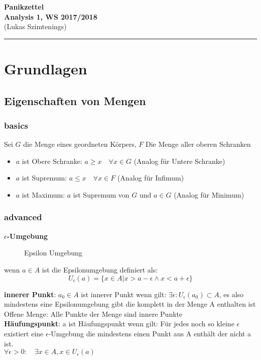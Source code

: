 \documentclass[12pt,a4paper]{article}
\begin{document}
\textbf{Panikzettel} \\ 
\textbf{Analysis 1, WS 2017/2018} \\
{\scriptsize (Lukas Szimtenings)}
\hrule 

\bigskip

\tableofcontents
\pagebreak
\section{Grundlagen}

\subsection{Eigenschaften von Mengen}

\subsubsection{basics}
Sei $G$ die Menge eines geordneten Körpers, $F$ Die Menge aller oberen Schranken
\begin{itemize}
\item $a$ ist Obere Schranke: $a\geq x\quad \forall x \in G$ (Analog für Untere Schranke)
\item $a$ ist Supremum: $a\leq x \quad \forall x \in F$ (Analog für Infimum)
\item $a$ ist Maximum: $a$ ist Supremum von $G$ und $a \in G$ (Analog für Minimum)
\end{itemize}


\subsubsection{advanced}
\textbf{$\epsilon$-Umgebung}\\
\begin{figure}[htbp]
  \centering
  
  \caption{Epsilon Umgebung}
\end{figure}
wenn $a\in A$ ist die Epsilonumgebung definiert als:\\
\[U_{\epsilon}(a)=\{ x\in A | x>a-\epsilon \wedge x<a+\epsilon\}\]

\textbf{innerer Punkt}: 
$a_0\in A$ ist innerer Punkt wenn gilt: $\exists \epsilon : U_{\epsilon}(a_0)\subset A$, es also mindestens eine Epsilonumgebung gibt die komplett in der Menge A enthalten ist\\
Offene Menge: Alle Punkte der Menge sind innere Punkte\\

\textbf{Häufungspunkt}: 
a ist Häufungspunkt wenn gilt: Für jedes noch so kleine $\epsilon$ existiert eine $\epsilon$-Umgebung die mindestens einen Punkt aus A enthält der nicht a ist.\\
$\forall \epsilon>0:\quad \exists x \in A, x \in U_{\epsilon}(a) $\\
\end{document}
